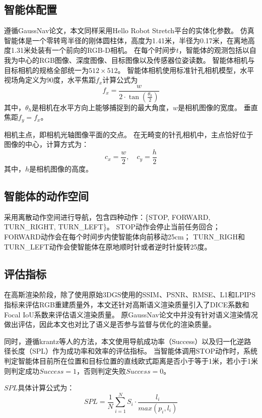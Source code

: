 \subsection{智能体配置}
遵循GaussNav论文，本文同样采用Hello Robot Stretch\cite{hello_robot_stretch_2}平台的实体化参数。
仿真智能体是一个零转弯半径的刚体圆柱体，高度为1.41米，半径为0.17米，在离地高度1.31米处装有一个前向的RGB-D相机。
在每个时间步$t$，智能体的观测包括以自我为中心的RGB图像、深度图像、目标图像以及传感器位姿读数。
智能体相机与目标相机的规格全部统一为$512\times 512$。
智能体相机使用标准针孔相机模型，水平视场角定义为90度，水平焦距$f_x$计算公式为
\begin{equation}
    f_x=\frac{w}{2\cdot \tan{(\frac{\theta_h}{2})}}
\end{equation}
其中，$\theta_h$是相机在水平方向上能够捕捉到的最大角度，$w$是相机图像的宽度。
垂直焦距$f_y=f_x$。

相机主点，即相机光轴图像平面的交点。
在无畸变的针孔相机中，主点恰好位于图像的中心，计算方式为：
\begin{equation}
    c_x = \frac{w}{2}, \quad c_y = \frac{h}{2}
\end{equation}
其中，$h$是相机图像的高度。

\subsection{智能体的动作空间}
采用离散动作空间进行导航，包含四种动作：\{STOP, FORWARD, TURN\_RIGHT, TURN\_LEFT\}。
STOP动作会停止当前任务回合；
FORWARD动作会在每个时间步内使智能体向前移动25cm；
TURN\_RIGH和TURN\_LEFT动作会使智能体在原地顺时针或者逆时针旋转25度。

\subsection{评估指标}
在高斯渲染阶段，除了使用原始3DGS使用的SSIM、PSNR、RMSE、L1和LPIPS指标来评估RGB重建质量外，本文还针对高斯语义渲染质量引入了DICE系数和Focal IoU系数来评估语义渲染质量。
原GaussNav论文中并没有针对语义渲染情况做出评估，因此本文也对比了语义是否参与监督与优化的渲染质量。

同时，遵循krantz等人\cite{krantz2023navigating}的方法，本文使用导航成功率（Success）以及归一化逆路径长度（SPL）\cite{anderson2018evaluation}作为成功率和效率的评估指标。
当智能体调用STOP动作时，系统判定智能体目前所在位置和目标位置的直线欧式距离是否小于等于1米，若小于1米则判定成功$Success=1$，否则判定失败$Success=0$。

$SPL$具体计算公式为：
\begin{equation}
    SPL=\frac{1}{N}\sum _{i=1}^{N}S_{i}\cdot \frac{l_i}{max(p_i,l_i)}
\end{equation}

